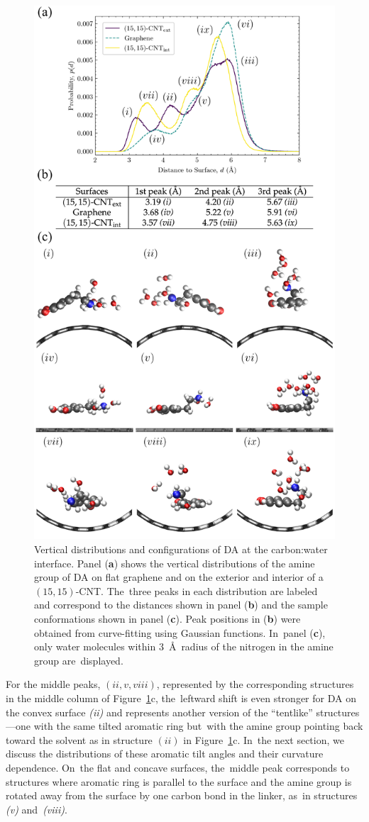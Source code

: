 \documentclass[molecules,article,accept,pdftex,moreauthors]{Definitions/mdpi}
\begin{document}
\begin{figure}[H]
  \includegraphics[width=.7\textwidth]{MergedFigs/fig8/output.png}
\caption{Vertical distributions and configurations of DA at the carbon:water interface. Panel (\textbf{a}) shows the vertical distributions of the amine group of DA on flat graphene and on the exterior and interior of a $(15,15)$-CNT. The~three peaks in each distribution are labeled and correspond to the distances shown in panel (\textbf{b}) and the sample conformations shown in panel (\textbf{c}). Peak positions in (\textbf{b}) were obtained from curve-fitting using Gaussian functions. In~panel (\textbf{c}), only water molecules within 3~\AA\ radius of the nitrogen in the amine group are~displayed.}
\label{fig:Conf_vertical_DAconf}
\end{figure}
   
For the middle peaks, $(ii, v, viii)$, represented by the corresponding structures in the middle column of Figure~\ref{fig:Conf_vertical_DAconf}c, the~leftward shift is even stronger for DA on the convex surface \textit{(ii)} and represents another version of the ``tentlike'' structures---one with the same tilted aromatic ring but~with the amine group pointing back toward the solvent as in structure $(ii)$ in Figure~\ref{fig:Conf_vertical_DAconf}c. In~the next section, we discuss the distributions of these aromatic tilt angles and their curvature dependence. On~the flat and concave surfaces, the~middle peak corresponds to structures where aromatic ring is parallel to the surface and the amine group is rotated away from the surface by one carbon bond in the linker, as~in structures \textit{(v)} \mbox{and \textit{(viii)}.}
  
\end{document}
